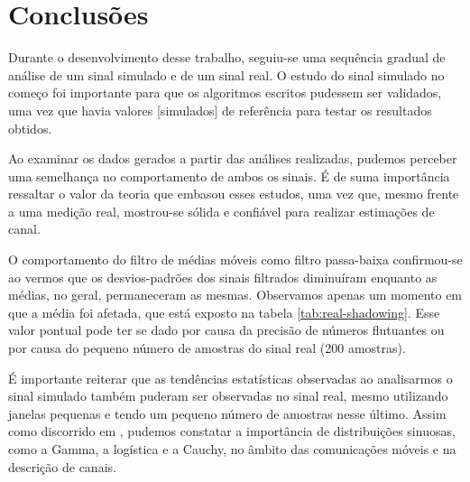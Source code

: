 \documentclass[journal,11pt,twocolumn]{IEEEtran}
\begin{document}
\section{Conclusões}
Durante o desenvolvimento desse trabalho, seguiu-se uma sequência gradual de análise de um sinal simulado e de um sinal real. O estudo do sinal simulado no começo foi importante para que os algoritmos escritos pudessem ser validados, uma vez que havia valores [simulados] de referência para testar os resultados obtidos.

Ao examinar os dados gerados a partir das análises realizadas, pudemos perceber uma semelhança no comportamento de ambos os sinais. É de suma importância ressaltar o valor da teoria que embasou esses estudos, uma vez que, mesmo frente a uma medição real, mostrou-se sólida e confiável para realizar estimações de canal.

O comportamento do filtro de médias móveis como filtro passa-baixa confirmou-se ao vermos que os desvios-padrões dos sinais filtrados diminuíram enquanto as médias, no geral, permaneceram as mesmas. Observamos apenas um momento em que a média foi afetada, que está exposto na tabela \ref{tab:real-shadowing}. Esse valor pontual pode ter se dado por causa da precisão de números flutuantes ou por causa do pequeno número de amostras do sinal real (200 amostras).

É importante reiterar que as tendências estatísticas observadas ao analisarmos o sinal simulado também puderam ser observadas no sinal real, mesmo utilizando janelas pequenas e tendo um pequeno número de amostras nesse último. Assim como discorrido em \cite{shadowing_book}, pudemos constatar a importância de distribuições sinuosas, como a Gamma, a logística e a Cauchy, no âmbito das comunicações móveis e na descrição de canais.


\end{document}
